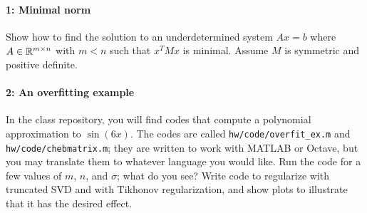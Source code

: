 \documentclass[12pt, leqno]{article} %
\begin{document}

\paragraph*{1: Minimal norm}
Show how to find the solution to an underdetermined system
$Ax = b$ where $A \in \mathbb{R}^{m \times n}$ with $m < n$ such
that $x^T M x$ is minimal.  Assume $M$ is symmetric and positive definite.

\paragraph*{2: An overfitting example}
In the class repository, you will find codes that compute
a polynomial approximation to $\sin(6x)$.  The codes are called
{\tt hw/code/overfit\_ex.m} and {\tt hw/code/chebmatrix.m};
they are written to work with MATLAB or Octave, but you may
translate them to whatever language you would like.  Run the code
for a few values of $m$, $n$, and $\sigma$; what do you see?
Write code to regularize with truncated SVD and with Tikhonov
regularization, and show plots to illustrate that it has the
desired effect.
\end{document}

